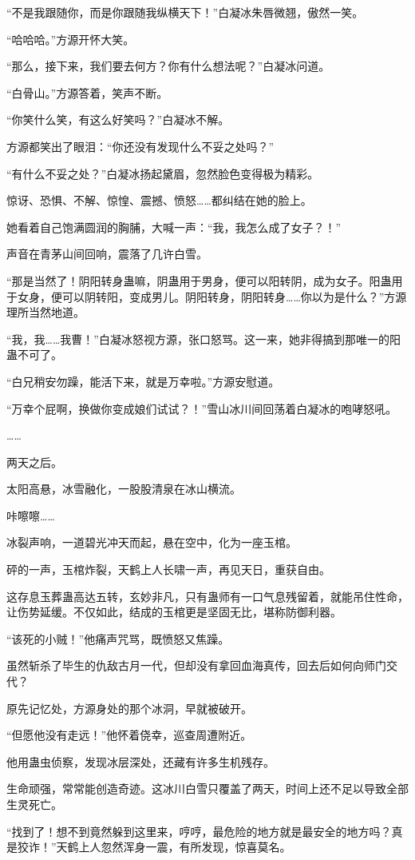 \begin{this_body}
“不是我跟随你，而是你跟随我纵横天下！”白凝冰朱唇微翘，傲然一笑。

“哈哈哈。”方源开怀大笑。

“那么，接下来，我们要去何方？你有什么想法呢？”白凝冰问道。

“白骨山。”方源答着，笑声不断。

“你笑什么笑，有这么好笑吗？”白凝冰不解。

方源都笑出了眼泪：“你还没有发现什么不妥之处吗？”

“有什么不妥之处？”白凝冰扬起黛眉，忽然脸色变得极为精彩。

惊讶、恐惧、不解、惊惶、震撼、愤怒……都纠结在她的脸上。

她看着自己饱满圆润的胸脯，大喊一声：“我，我怎么成了女子？！”

声音在青茅山间回响，震落了几许白雪。

“那是当然了！阴阳转身蛊嘛，阴蛊用于男身，便可以阳转阴，成为女子。阳蛊用于女身，便可以阴转阳，变成男儿。阴阳转身，阴阳转身……你以为是什么？”方源理所当然地道。

“我，我……我曹！”白凝冰怒视方源，张口怒骂。这一来，她非得搞到那唯一的阳蛊不可了。

“白兄稍安勿躁，能活下来，就是万幸啦。”方源安慰道。

“万幸个屁啊，换做你变成娘们试试？！”雪山冰川间回荡着白凝冰的咆哮怒吼。

……

两天之后。

太阳高悬，冰雪融化，一股股清泉在冰山横流。

咔嚓嚓……

冰裂声响，一道碧光冲天而起，悬在空中，化为一座玉棺。

砰的一声，玉棺炸裂，天鹤上人长啸一声，再见天日，重获自由。

这存息玉葬蛊高达五转，玄妙非凡，只有蛊师有一口气息残留着，就能吊住性命，让伤势延缓。不仅如此，结成的玉棺更是坚固无比，堪称防御利器。

“该死的小贼！”他痛声咒骂，既愤怒又焦躁。

虽然斩杀了毕生的仇敌古月一代，但却没有拿回血海真传，回去后如何向师门交代？

原先记忆处，方源身处的那个冰洞，早就被破开。

“但愿他没有走远！”他怀着侥幸，巡查周遭附近。

他用蛊虫侦察，发现冰层深处，还藏有许多生机残存。

生命顽强，常常能创造奇迹。这冰川白雪只覆盖了两天，时间上还不足以导致全部生灵死亡。

“找到了！想不到竟然躲到这里来，哼哼，最危险的地方就是最安全的地方吗？真是狡诈！”天鹤上人忽然浑身一震，有所发现，惊喜莫名。


\end{this_body}
